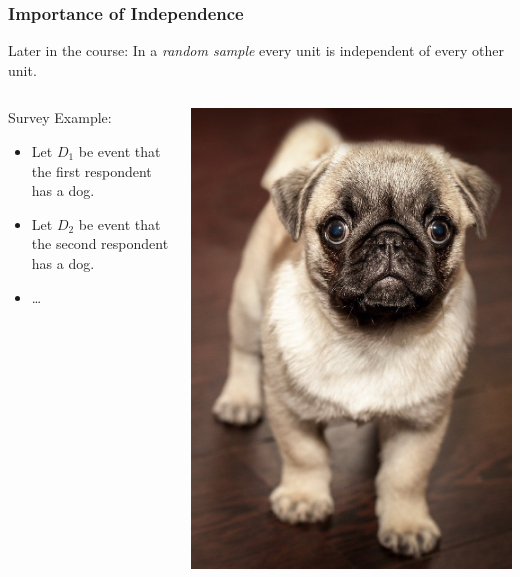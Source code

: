 \documentclass[12pt, block=fill]{beamer}
\begin{document}
\begin{frame}
  \frametitle{Importance of Independence}

Later in the course: In a \textit{random sample} every unit is independent of every other unit.




  \begin{columns}
\begin{column}{0.65\textwidth}
Survey Example:

\begin{itemize}
\item Let $D_1$ be event that the first respondent has a dog.
\item Let $D_2$ be event that the second respondent has a dog.
\item \dots 
\end{itemize}

\end{column}
\begin{column}{0.35\textwidth}  %
    \begin{center}
     \includegraphics[width=\textwidth]{figures/pug}
     \end{center}
\end{column}
\end{columns}


\end{frame}
\end{document}
